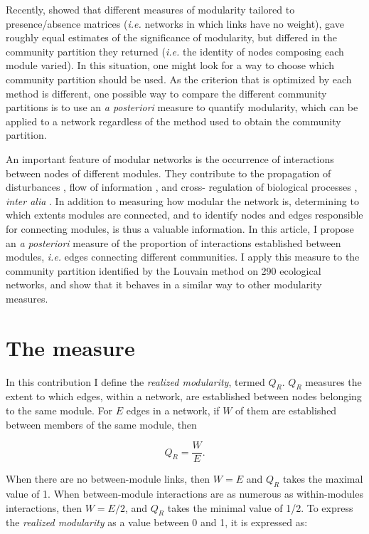 \documentclass[12pt,oneside]{article}
\begin{document}
Recently, \textcite{thebault_identifying_2012} showed that different measures
of modularity tailored to presence/absence matrices (\emph{i.e.} networks in
which links have no weight), gave roughly equal estimates of the significance
of modularity, but differed in the community partition they returned
(\emph{i.e.} the identity of nodes composing each module varied). In this
situation, one might look for a way to choose which community partition should
be used. As the criterion that is optimized by each method is different, one
possible way to compare the different community partitions is to use an
\emph{a posteriori} measure to quantify modularity, which can be applied to a
network regardless of the method used to obtain the community partition.

An important feature of modular networks is the occurrence of interactions
between nodes of different modules. They contribute to the propagation of
disturbances \parencite{olesen_modularity_2007}, flow of information
\cite{wiederhold_mediators_1992,leskovec_statistical_2008}, and cross-
regulation of biological processes \cite{hartwell_molecular_1999}, \emph{inter
alia} \cite{rosvall_maps_2008}. In addition to measuring how modular the
network is, determining to which extents modules are connected, and to
identify nodes and edges responsible for connecting modules, is thus a
valuable information. In this article, I propose an \emph{a posteriori}
measure of the proportion of interactions established between modules,
\emph{i.e.} edges connecting different communities. I apply this measure to
the community partition identified by the Louvain method on 290 ecological
networks, and show that it behaves in a similar way to other modularity
measures.

\section{The measure}

In this contribution I define the \emph{realized modularity}, termed $Q_R$.
$Q_R$ measures the extent to which edges, within a network, are established
between nodes belonging to the same module. For $E$ edges in a network, if $W$
of them are established between members of the same module, then

\begin{equation}
	Q_R = \frac{W}{E} .
 	\label{e:qr}
\end{equation} 

When there are no between-module links, then $W = E$ and $Q_R$ takes the
maximal value of 1. When between-module interactions are as numerous as
within-modules interactions, then $W = E/2$, and $Q_R$ takes the minimal value
of 1/2. To express the \emph{realized modularity} as a value between 0 and 1,
it is expressed as:
\end{document}
